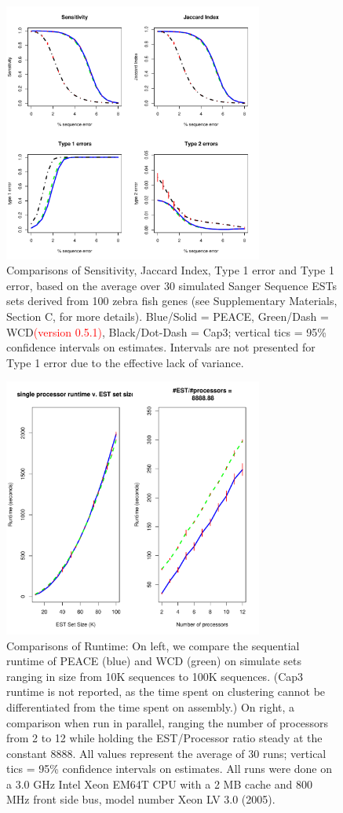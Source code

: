 \documentclass[a4,center,fleqn]{NAR}
\newcommand{\mc}[1]{\textcolor{red}{#1}}
\newcommand{\peace} {{\small PEACE}}
\newcommand{\wcd} {{\small WCD}}
\newcommand{\capthree} {{\small Cap3}}
\begin{document}
\begin{figure}
  \centerline{\includegraphics[width=3.35in]{pics.d/SeJiT1T2x40.pdf}}
  \caption{Comparisons of Sensitivity, Jaccard Index, Type 1 error and
    Type 1 error, based on the average over 30 simulated Sanger
    Sequence ESTs sets derived from 100 zebra fish genes (see
    Supplementary Materials, Section C, for more details).  Blue/Solid
    = \peace, Green/Dash = \wcd \mc{(version 0.5.1)}, Black/Dot-Dash =
    \capthree; vertical tics = 95\% confidence intervals on estimates.
    Intervals are not presented for Type 1 error due to the effective
    lack of variance.}\label{SeJiT1T2}
\end{figure}

\begin{figure}
   \centerline{\includegraphics[width=3.35in]{pics.d/seq_parallel.pdf}}
   \caption{Comparisons of Runtime: On left, we compare the sequential
     runtime of \peace\/ (blue) and \wcd\/ (green) on simulate sets
     ranging in size from 10K sequences to 100K sequences.  (\capthree\/
     runtime is not reported, as the time spent on clustering cannot
     be differentiated from the time spent on assembly.)  On right,
     a comparison when run in parallel, ranging the number of
     processors from 2 to 12 while holding the EST/Processor ratio
     steady at the constant 8888.  All values represent the average
     of 30 runs; vertical tics = 95\% confidence intervals on
     estimates.  All runs were done on a 3.0 GHz Intel Xeon EM64T CPU with a 2 MB
     cache and 800 MHz front side bus, model number Xeon LV 3.0 (2005).}\label{seq_parallel}
\end{figure}
\end{document}
